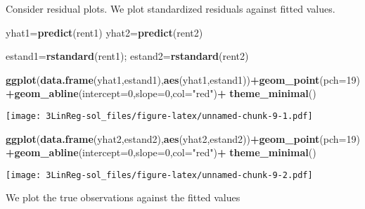 \documentclass[]{article}
\newenvironment{Shaded}{\begin{snugshade}}{\end{snugshade}}
\newcommand{\KeywordTok}[1]{\textcolor[rgb]{0.13,0.29,0.53}{\textbf{#1}}}
\newcommand{\DataTypeTok}[1]{\textcolor[rgb]{0.13,0.29,0.53}{#1}}
\newcommand{\DecValTok}[1]{\textcolor[rgb]{0.00,0.00,0.81}{#1}}
\newcommand{\StringTok}[1]{\textcolor[rgb]{0.31,0.60,0.02}{#1}}
\newcommand{\OperatorTok}[1]{\textcolor[rgb]{0.81,0.36,0.00}{\textbf{#1}}}
\newcommand{\NormalTok}[1]{#1}
\begin{document}
Consider residual plots. We plot standardized residuals against fitted
values.

\begin{Shaded}
\begin{Highlighting}[]
\NormalTok{yhat1=}\KeywordTok{predict}\NormalTok{(rent1)}
\NormalTok{yhat2=}\KeywordTok{predict}\NormalTok{(rent2)}

\NormalTok{estand1=}\KeywordTok{rstandard}\NormalTok{(rent1);}
\NormalTok{estand2=}\KeywordTok{rstandard}\NormalTok{(rent2)}
 
\KeywordTok{ggplot}\NormalTok{(}\KeywordTok{data.frame}\NormalTok{(yhat1,estand1),}\KeywordTok{aes}\NormalTok{(yhat1,estand1))}\OperatorTok{+}\KeywordTok{geom_point}\NormalTok{(}\DataTypeTok{pch=}\DecValTok{19}\NormalTok{)}\OperatorTok{+}\KeywordTok{geom_abline}\NormalTok{(}\DataTypeTok{intercept=}\DecValTok{0}\NormalTok{,}\DataTypeTok{slope=}\DecValTok{0}\NormalTok{,}\DataTypeTok{col=}\StringTok{"red"}\NormalTok{)}\OperatorTok{+}\StringTok{  }\KeywordTok{theme_minimal}\NormalTok{()}
\end{Highlighting}
\end{Shaded}

\texttt{[image: 3LinReg-sol\_files/figure-latex/unnamed-chunk-9-1.pdf]}

\begin{Shaded}
\begin{Highlighting}[]
\KeywordTok{ggplot}\NormalTok{(}\KeywordTok{data.frame}\NormalTok{(yhat2,estand2),}\KeywordTok{aes}\NormalTok{(yhat2,estand2))}\OperatorTok{+}\KeywordTok{geom_point}\NormalTok{(}\DataTypeTok{pch=}\DecValTok{19}\NormalTok{)}\OperatorTok{+}\KeywordTok{geom_abline}\NormalTok{(}\DataTypeTok{intercept=}\DecValTok{0}\NormalTok{,}\DataTypeTok{slope=}\DecValTok{0}\NormalTok{,}\DataTypeTok{col=}\StringTok{"red"}\NormalTok{)}\OperatorTok{+}\StringTok{  }\KeywordTok{theme_minimal}\NormalTok{()}
\end{Highlighting}
\end{Shaded}

\texttt{[image: 3LinReg-sol\_files/figure-latex/unnamed-chunk-9-2.pdf]}

We plot the true observations against the fitted values

\begin{Shaded}
\end{Shaded}
\end{document}
